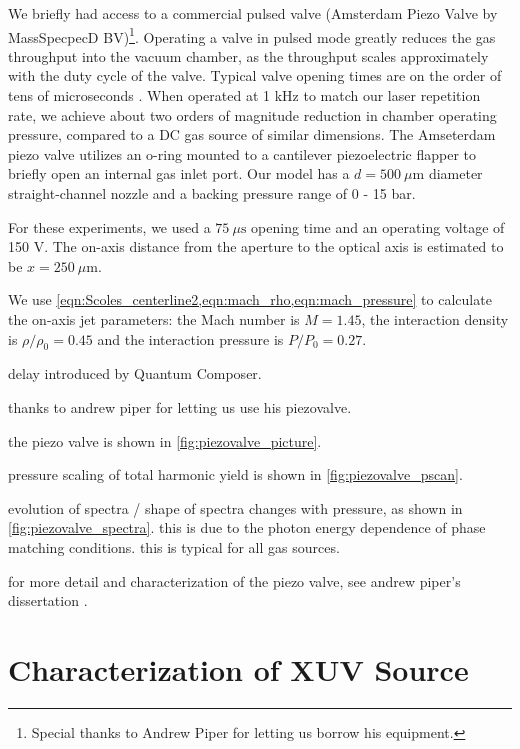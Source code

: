 We briefly had access to a commercial pulsed valve (Amsterdam Piezo Valve by MassSpecpecD BV)\footnote{Special thanks to Andrew Piper for letting us borrow his equipment.}. Operating a valve in pulsed mode greatly reduces the gas throughput into the vacuum chamber, as the throughput scales approximately with the duty cycle of the valve. Typical valve opening times are on the order of tens of microseconds \cite{irimiaSituCharacterizationCold2009,mengMeasurementDensityProfile2015,irimiaShortPulseMicrosecond2009}. When operated at 1 kHz to match our laser repetition rate, we achieve about two orders of magnitude reduction in chamber operating pressure, compared to a DC gas source of similar dimensions. The Amseterdam piezo valve utilizes an o-ring mounted to a cantilever piezoelectric flapper to briefly open an internal gas inlet port. Our model has a $d = 500 \ \mu \textrm{m}$ diameter straight-channel nozzle and a backing pressure range of 0 - 15 bar.

For these experiments, we used a $75 \ \mu \textrm{s}$ opening time and an operating voltage of 150 V. The on-axis distance from the aperture to the optical axis is estimated to be $x = 250 \ \mu \textrm{m}$.

We use \cref{eqn:Scoles_centerline2,eqn:mach_rho,eqn:mach_pressure} to calculate the on-axis jet parameters: the Mach number is $M=1.45$, the interaction density is $\rho/\rho_0 = 0.45$ and the interaction pressure is $P/P_0 = 0.27$.

delay introduced by Quantum Composer.

thanks to andrew piper for letting us use his piezovalve.

the piezo valve is shown in \cref{fig:piezovalve_picture}.

pressure scaling of total harmonic yield is shown in \cref{fig:piezovalve_pscan}.

evolution of spectra / shape of spectra changes with pressure, as shown in \cref{fig:piezovalve_spectra}. this is due to the photon energy dependence of phase matching conditions. this is typical for all gas sources.

for more detail and characterization of the piezo valve, see andrew piper's dissertation \cite{piperAndrewPiperDissertation2022}.



\section{Characterization of XUV Source}

